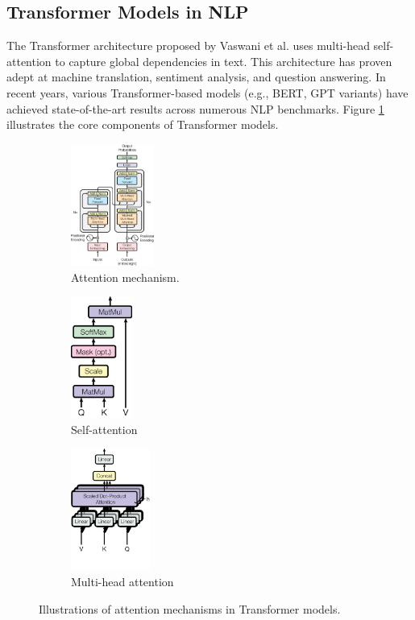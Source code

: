 \documentclass[12pt]{article}
\begin{document}
\subsection{Transformer Models in NLP}
The Transformer architecture proposed by Vaswani et al. \cite{ref1} uses multi-head self-attention to capture global dependencies in text. This architecture has proven adept at machine translation, sentiment analysis, and question answering. In recent years, various Transformer-based models (e.g., BERT, GPT variants) have achieved state-of-the-art results across numerous NLP benchmarks. Figure \ref{fig:attention_mechanisms} illustrates the core components of Transformer models.

\begin{figure}[!ht]
	\centering
	\begin{subfigure}[b]{0.32\textwidth}
		\centering
		\includegraphics[height=4cm]{attention.png}
		\caption{Attention mechanism.}
	\end{subfigure}
	\hfill
	\begin{subfigure}[b]{0.32\textwidth}
		\centering
		\includegraphics[height=4cm]{self_attention_mechanism.png}
		\caption{Self-attention}
	\end{subfigure}
	\hfill
	\begin{subfigure}[b]{0.32\textwidth}
		\centering
		\includegraphics[height=4cm]{multihead_attention.png}
		\caption{Multi-head attention}
	\end{subfigure}
	\caption{Illustrations of attention mechanisms in Transformer models.}
	\label{fig:attention_mechanisms}
\end{figure}
\end{document}
